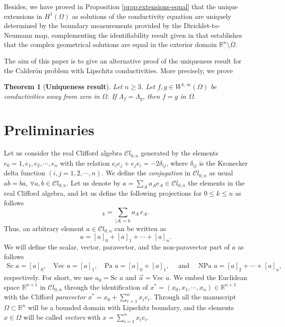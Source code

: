 \documentclass[12pt]{article}
\newtheorem{theorem}{Theorem}
\def\R{\mathbb{R}}
\begin{document}
Besides, we have proved in Proposition \ref{prop:extensions-equal} that the unique extensions in $H^1(\Omega)$ as solutions of the conductivity equation are uniquely determined by the boundary measurements provided by the Dirichlet-to-Neumann map, complementing the identifiability result given in \cite{Sylvester-Uhlmann} that establishes that the complex geometrical solutions are equal in the exterior domain $\mathbb{R}^n\setminus \overline{\Omega}$. 

The aim of this paper is to give an alternative proof of the uniqueness result for the Calderón problem with Lipschitz conductivities. More precisely, we prove 
\begin{theorem}[\textbf{Uniqueness result}]\label{th:uniqueness}
Let $n\geq 3$. Let $f, g\in W^{1,\infty}(\Omega)$ be conductivities away from zero in $\Omega$. If $\Lambda_f=\Lambda_g$, then $f=g$ in $\Omega$.
\end{theorem}



\section{Preliminaries}\label{sec:Preliminaries}
Let us consider the real Clifford algebra $\mathcal{C}l_{0,n}$ generated by the elements $e_0=1,e_1,e_2,\cdots,e_n$ with the relation $e_ie_j+e_je_i=-2\delta_{ij}$, where 
$\delta_{ij}$ is the Kronecker delta function $(i,j=1,2,\cdots,n)$. We define the \textit{conjugation} in $\mathcal{C}l_{0,n}$ as usual $\overline{ab}=\overline{b}\overline{a}$, $\forall a,b\in \mathcal{C}l_{0,n}$.
Let us denote by $a=\sum_{A} a_A e_A\in \mathcal{C}l_{0,n}$ the elements in the real Clifford algebra, and let us define the following projections for $0\leq k\leq n$ as follows
\begin{equation*}
[a]_k=\sum_{|A|=k} a_A\, e_A.
\end{equation*}
Thus, an arbitrary element $a\in \mathcal{C}l_{0,n}$ can be written as
\begin{equation*}
a=[a]_0+[a]_1+\cdots +[a]_n.
\end{equation*}
We will define the scalar, vector, paravector, and the non-paravector part of $a$ as follows
\begin{align*}
\text{Sc }a=[a]_0,\quad \text{Vec }a=[a]_1, \quad \text{Pa }a=[a]_0+[a]_1, \quad \text{ and } \quad \text{NPa }a=[a]_2+\cdots+[a]_n, 
\end{align*}
respectively. For short, we use $a_0=\text{Sc }a$ and $\vec a=\text{Vec }a$. We embed the Euclidean space $\R^{n+1}$ in $\mathcal{C}l_{0,n}$ through the identification of $x^*=(x_0,x_1,\cdots,x_n)\in \R^{n+1}$ with the Clifford \textit{paravector} $x^*=x_0+\sum_{i=1}^n x_ie_i$. 
Through all the manuscript $\Omega\subset \R^n$ will be a bounded domain with Lipschitz boundary, and the elements $x\in \Omega$ will be called \textit{vectors} with $x=\sum_{i=1}^n x_ie_i$.
\end{document}
